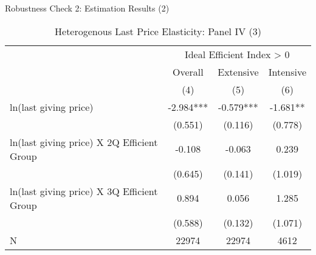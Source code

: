 \documentclass[
  ignorenonframetext,
]{beamer}
\begin{document}
\begin{frame}{Robustness Check 2: Estimation Results (2)}
\protect\hypertarget{robustness-check-2-estimation-results-2}{}
\begin{table}

\caption{\label{tab:kableHeteroLastElasticitySlide3}Heterogenous Last Price Elasticity: Panel IV (3)}
\centering
\fontsize{8}{10}\selectfont
\begin{tabular}[t]{lccc}
\toprule
\multicolumn{1}{c}{ } & \multicolumn{3}{c}{Ideal Efficient Index > 0} \\
\cmidrule(l{3pt}r{3pt}){2-4}
\multicolumn{1}{c}{ } & \multicolumn{1}{c}{Overall} & \multicolumn{1}{c}{Extensive} & \multicolumn{1}{c}{Intensive} \\
\cmidrule(l{3pt}r{3pt}){2-2} \cmidrule(l{3pt}r{3pt}){3-3} \cmidrule(l{3pt}r{3pt}){4-4}
 & (4) & (5) & (6)\\
\midrule
ln(last giving price) & -2.984*** & -0.579*** & -1.681**\\
 & (0.551) & (0.116) & (0.778)\\
ln(last giving price) X 2Q Efficient Group & -0.108 & -0.063 & 0.239\\
 & (0.645) & (0.141) & (1.019)\\
ln(last giving price) X 3Q Efficient Group & 0.894 & 0.056 & 1.285\\
 & (0.588) & (0.132) & (1.071)\\
N & 22974 & 22974 & 4612\\
\bottomrule
\end{tabular}
\end{table}
\end{frame}
\end{document}
